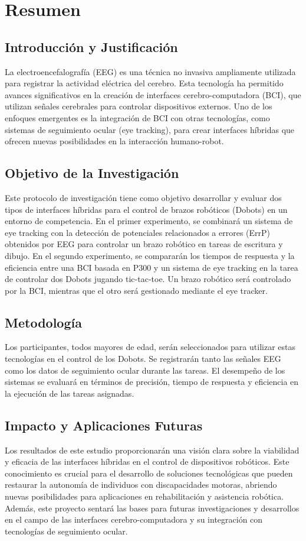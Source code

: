 \documentclass[12pt]{article}
\begin{document}
\section{Resumen}

\subsection{Introducción y Justificación}
La electroencefalografía (EEG) es una técnica no invasiva ampliamente 
utilizada para registrar la actividad eléctrica del cerebro. 
Esta tecnología ha permitido avances significativos en la creación 
de interfaces cerebro-computadora (BCI), que utilizan señales cerebrales para 
controlar dispositivos externos. Uno de los enfoques emergentes es la integración 
de BCI con otras tecnologías, como sistemas de seguimiento ocular (eye tracking), 
para crear interfaces híbridas que ofrecen nuevas posibilidades en la interacción 
humano-robot.

\subsection{Objetivo de la Investigación}
Este protocolo de investigación tiene como objetivo desarrollar y evaluar dos 
tipos de interfaces híbridas para el control de brazos robóticos (Dobots) en un 
entorno de competencia. En el primer experimento, se combinará un sistema de eye 
tracking con la detección de potenciales relacionados a errores (ErrP) obtenidos 
por EEG para controlar un brazo robótico en tareas de escritura y dibujo. 
En el segundo experimento, se compararán los tiempos de respuesta y la eficiencia 
entre una BCI basada en P300 y un sistema de eye tracking en la tarea de controlar 
dos Dobots jugando tic-tac-toe. Un brazo robótico será controlado por la BCI, 
mientras que el otro será gestionado mediante el eye tracker.

\subsection{Metodología}
Los participantes, todos mayores de edad, serán seleccionados para utilizar 
estas tecnologías en el control de los Dobots. Se registrarán tanto las señales 
EEG como los datos de seguimiento ocular durante las tareas. El desempeño de los 
sistemas se evaluará en términos de precisión, tiempo de respuesta y eficiencia en 
la ejecución de las tareas asignadas.

\subsection{Impacto y Aplicaciones Futuras}
Los resultados de este estudio proporcionarán una visión clara sobre la viabilidad 
y eficacia de las interfaces híbridas en el control de dispositivos robóticos. 
Este conocimiento es crucial para el desarrollo de soluciones tecnológicas que 
pueden restaurar la autonomía de individuos con discapacidades motoras, abriendo 
nuevas posibilidades para aplicaciones en rehabilitación y asistencia robótica. 
Además, este proyecto sentará las bases para futuras investigaciones y desarrollos 
en el campo de las interfaces cerebro-computadora y su integración con tecnologías 
de seguimiento ocular.
\end{document}
